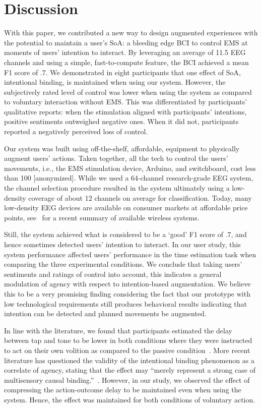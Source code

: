 \section{Discussion}
With this paper, we contributed a new way to design augmented experiences with the potential to maintain a user's SoA: a bleeding edge BCI to control EMS at moments of users' intention to interact. By leveraging an average of 11.5 EEG channels and using a simple, fast-to-compute feature, the BCI achieved a mean F1 score of .7. We demonstrated in eight participants that one effect of SoA, intentional binding, is maintained when using our system. However, the subjectively rated level of control was lower when using the system as compared to voluntary interaction without EMS. This was differentiated by participants' qualitative reports: when the stimulation aligned with participants' intentions, positive sentiments outweighed negative ones. When it did not, participants reported a negatively perceived loss of control.

Our system was built using off-the-shelf, affordable, equipment to physically augment users' actions. Taken together, all the tech to control the users' movements, i.e., the EMS stimulation device, Arduino, and switchboard, cost less than 100 [anonymized]. While we used a 64-channel research-grade EEG system, the channel selection procedure resulted in the system ultimately using a low-density coverage of about 12 channels on average for classification. Today, many low-density EEG devices are available on consumer markets at affordable price points, see~\citet{Niso2023-ce} for a recent summary of available wireless systems. 

Still, the system achieved what is considered to be a `good' F1 score of .7, and hence sometimes detected users' intention to interact. In our user study, this system performance affected users' performance in the time estimation task when comparing the three experimental conditions. We conclude that taking users' sentiments and ratings of control into account, this indicates a general modulation of agency with respect to intention-based augmentation. We believe this to be a very promising finding considering the fact that our prototype with low technological requirements still produces behavioral results indicating that intention can be detected and planned movements be augmented.

In line with the literature, we found that participants estimated the delay between tap and tone to be lower in both conditions where they were instructed to act on their own volition as compared to the passive condition~\cite{Moore2012-dk}. More recent literature has questioned the validity of the intentional binding phenomenon as a correlate of agency, stating that the effect may ``merely represent a strong case of multisensory causal binding.''~\cite{Suzuki2019-pi, Gutzeit2023-ei, Hoerl2020-my}. However, in our study, we observed the effect of compressing the action-outcome delay to be maintained even when using the system. Hence, the effect was maintained for both conditions of voluntary action.


